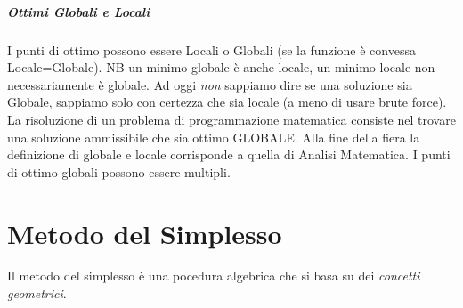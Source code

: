 \documentclass[12pt, a4paper, openany]{book}
\begin{document}
\paragraph*{Ottimi Globali e Locali}
I punti di ottimo possono essere Locali o Globali (se la funzione è convessa Locale=Globale). NB un minimo globale è anche locale, un minimo locale non necessariamente è globale.
Ad oggi \emph{non} sappiamo dire se una soluzione sia Globale, sappiamo solo con certezza che sia locale (a meno di usare brute force).
\\La risoluzione di un problema di programmazione matematica consiste nel trovare una soluzione ammissibile che sia ottimo GLOBALE.
Alla fine della fiera la definizione di globale e locale corrisponde a quella di Analisi Matematica.
I punti di ottimo globali possono essere multipli.

\chapter{Metodo del Simplesso}
Il metodo del simplesso è una pocedura algebrica che si basa su dei \emph{concetti geometrici}.
\end{document}
